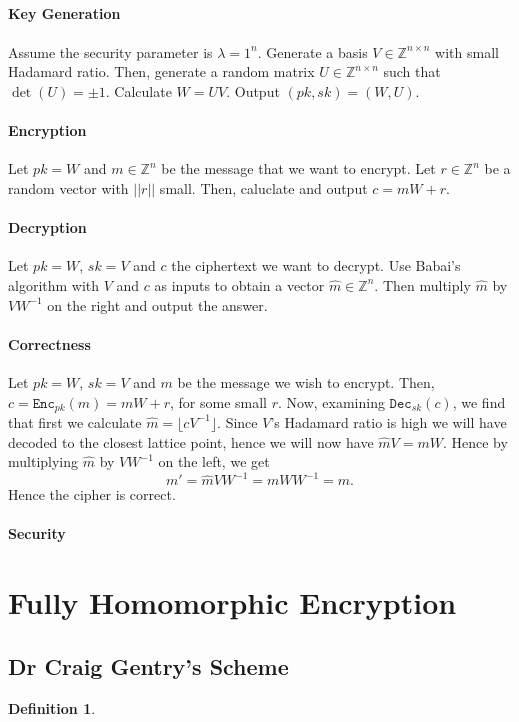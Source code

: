 \documentclass{article}
\theoremstyle{definition}
\newtheorem{definition}{Definition}[section]
\newcommand{\Enc}{\texttt{Enc}}
\newcommand{\Dec}{\texttt{Dec}}
\newcommand{\Int}{\mathbb{Z}}
\newcommand{\norm}[1]{||#1||}
\begin{document}
\paragraph{Key Generation}
\paragraph{} Assume the security parameter is $\lambda = 1^n$. Generate a basis
$V \in \Int^{n\times n}$ with small Hadamard ratio. Then, generate a random matrix
$U \in \Int^{n\times n}$ such that $\det(U) = \pm 1$. Calculate $W = UV$. Output
$(pk, sk) = (W, U)$.
\paragraph{Encryption}
Let $pk = W$ and $m \in \Int^n$ be the message that we want to encrypt. Let $r
\in \Int^n$ be a random vector with $\norm{r}$ small. Then, caluclate and output
$c = mW + r$.
\paragraph{Decryption}
Let $pk = W$, $sk = V$ and $c$ the ciphertext we want to decrypt. Use Babai's
algorithm with $V$ and $c$ as inputs to obtain a vector $\hat{m} \in \Int^n$. Then multiply
$\hat{m}$ by $VW^{-1}$ on the right and output the answer.
\paragraph{Correctness}
Let $pk = W$, $sk = V$ and $m$ be the message we wish to encrypt. Then, $c =
\Enc_{pk}(m) = mW + r$, for some small $r$. Now, examining $\Dec_{sk}(c)$, we
find that first we calculate $\hat{m} = \lfloor cV^{-1} \rfloor$. Since $V$'s
Hadamard ratio is high we will have decoded to the closest lattice point, hence
we will now have $\hat{m}V = mW$. Hence by multiplying $\hat{m}$ by $VW^{-1}$ on
the left, we get
\[
  m' = \hat{m}VW^{-1} = mWW^{-1} = m.
\]
Hence the cipher is correct.
\paragraph{Security}
\section{Fully Homomorphic Encryption}
\subsection{Dr Craig Gentry's Scheme}
\cite{gentryImplementation}
\cite{smartImplementation}
\begin{definition}
\end{definition}

\printbibliography
\end{document}
